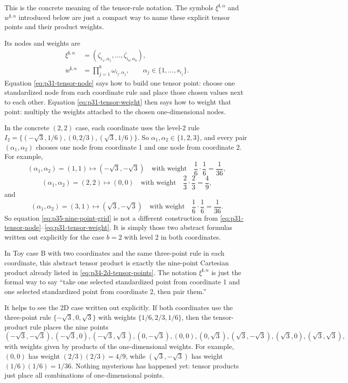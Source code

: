 \documentclass[11pt]{article}
\numberwithin{equation}{section}
\begin{document}
This is the concrete meaning of the tensor-rule notation.  The symbols
\(\xi^{\mathbf i,\alpha}\) and \(w^{\mathbf i,\alpha}\) introduced below are just
a compact way to name these explicit tensor points and their product weights.

Its nodes and weights are
\begin{align}
  \xi^{\mathbf i,\alpha}
  &=
  (\zeta_{i_1,\alpha_1},\ldots,\zeta_{i_b,\alpha_b}),
  \label{eq:p31-tensor-node}\\
  w^{\mathbf i,\alpha}
  &=
  \prod_{j=1}^b\omega_{i_j,\alpha_j},
  \qquad
  \alpha_j\in\{1,\ldots,s_{i_j}\}.
  \label{eq:p31-tensor-weight}
\end{align}
Equation \eqref{eq:p31-tensor-node} says how to build one tensor point: choose one
standardized node from each coordinate rule and place those chosen values next to
each other.  Equation \eqref{eq:p31-tensor-weight} then says how to weight that
point: multiply the weights attached to the chosen one-dimensional nodes.

In the concrete \((2,2)\) case, each coordinate uses the level-2 rule
\(I_2=\{(-\sqrt3,1/6),(0,2/3),(\sqrt3,1/6)\}\).  So
\(\alpha_1,\alpha_2\in\{1,2,3\}\), and every pair
\((\alpha_1,\alpha_2)\) chooses one node from coordinate 1 and one node from
coordinate 2.  For example,
\[
  (\alpha_1,\alpha_2)=(1,1)
  \mapsto
  (-\sqrt3,-\sqrt3)
  \quad\text{with weight}\quad
  \frac16\cdot\frac16=\frac1{36},
\]
\[
  (\alpha_1,\alpha_2)=(2,2)
  \mapsto
  (0,0)
  \quad\text{with weight}\quad
  \frac23\cdot\frac23=\frac49,
\]
and
\[
  (\alpha_1,\alpha_2)=(3,1)
  \mapsto
  (\sqrt3,-\sqrt3)
  \quad\text{with weight}\quad
  \frac16\cdot\frac16=\frac1{36}.
\]
So equation \eqref{eq:p35-nine-point-grid} is not a different construction from
\eqref{eq:p31-tensor-node}--\eqref{eq:p31-tensor-weight}.  It is simply those two
abstract formulas written out explicitly for the case \(b=2\) with level 2 in
both coordinates.

In Toy case B with two coordinates and the same three-point rule in each
coordinate, this abstract tensor product is exactly the nine-point Cartesian
product already listed in \eqref{eq:p34-2d-tensor-points}.  The notation
\(\xi^{\mathbf i,\alpha}\) is just the formal way to say ``take one selected
standardized point from coordinate 1 and one selected standardized point from
coordinate 2, then pair them.''

It helps to see the 2D case written out explicitly.  If both coordinates use the
three-point rule \(\{-\sqrt3,0,\sqrt3\}\) with weights
\(\{1/6,2/3,1/6\}\), then the tensor-product rule places the nine points
\begin{equation}
  (-\sqrt3,-\sqrt3),
  (-\sqrt3,0),
  (-\sqrt3,\sqrt3),
  (0,-\sqrt3),
  (0,0),
  (0,\sqrt3),
  (\sqrt3,-\sqrt3),
  (\sqrt3,0),
  (\sqrt3,\sqrt3),
  \label{eq:p35-nine-point-grid}
\end{equation}
with weights given by products of the one-dimensional weights.  For example,
\((0,0)\) has weight \((2/3)(2/3)=4/9\), while
\((\sqrt3,-\sqrt3)\) has weight \((1/6)(1/6)=1/36\).  Nothing mysterious has
happened yet: tensor products just place all combinations of one-dimensional
points.
\end{document}

